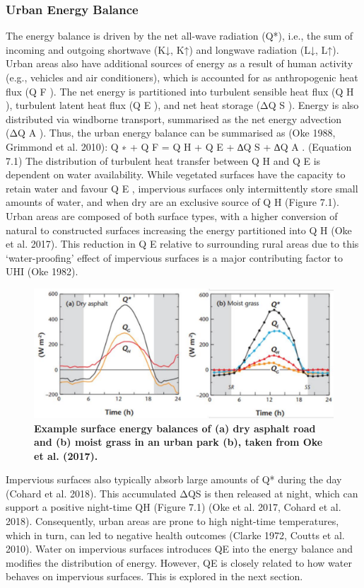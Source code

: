 \documentclass[final,3p,times,authoryear]{elsarticle}
\begin{document}
\subsubsection{Urban Energy Balance}\label{sec:appendix7.1.2.1}
The energy balance is driven by the net all-wave radiation (Q*), i.e., the sum of
incoming and outgoing shortwave (K↓, K↑) and longwave radiation (L↓, L↑).
Urban areas also have additional sources of energy as a result of human activity (e.g.,
vehicles and air conditioners), which is accounted for as anthropogenic heat flux (Q F ).
The net energy is partitioned into turbulent sensible heat flux (Q H ), turbulent latent heat
flux (Q E ), and net heat storage (ΔQ S ). Energy is also distributed via windborne
transport, summarised as the net energy advection (ΔQ A ). Thus, the urban energy
balance can be summarised as (Oke 1988, Grimmond et al. 2010):
Q ∗ + Q F = Q H + Q E + ∆Q S + ∆Q A .
(Equation 7.1)
The distribution of turbulent heat transfer between Q H and Q E is dependent on water
availability. While vegetated surfaces have the capacity to retain water and favour Q E ,
impervious surfaces only intermittently store small amounts of water, and when dry are
an exclusive source of Q H (Figure 7.1). Urban areas are composed of both surface types,
with a higher conversion of natural to constructed surfaces increasing the energy
partitioned into Q H (Oke et al. 2017). This reduction in Q E relative to surrounding rural
areas due to this ‘water-proofing’ effect of impervious surfaces is a major contributing
factor to UHI (Oke 1982).

\begin{figure}
\centering
\includegraphics[trim={0 0 0 0},clip,scale=1.0]{SEB.png}
\caption{\bf Example surface energy balances of (a) dry asphalt road and (b) moist grass in an urban
park (b), taken from Oke et al. (2017).}
 \label{fig:7.1}
\end{figure}

Impervious surfaces also typically absorb large amounts of Q* during the day (Cohard
et al. 2018). This accumulated ΔQS is then released at night, which can support a
positive night-time QH (Figure 7.1) (Oke et al. 2017, Cohard et al. 2018).
Consequently, urban areas are prone to high night-time temperatures, which in turn, can
led to negative health outcomes (Clarke 1972, Coutts et al. 2010).
Water on impervious surfaces introduces QE into the energy balance and modifies the
distribution of energy. However, QE is closely related to how water behaves on
impervious surfaces. This is explored in the next section.
\end{document}
